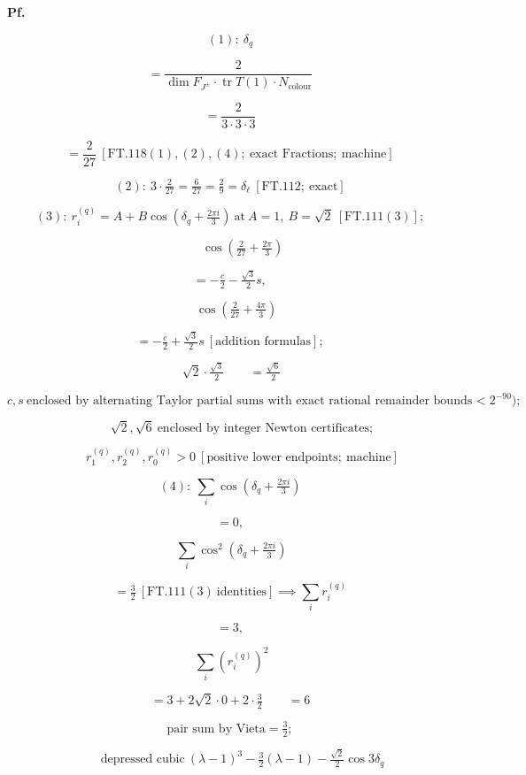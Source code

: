 \begin{theorem}[{\texorpdfstring{FT.119 — The triplet-attached mixing angle $\delta_q=2/27$ and its spectrum}{FT.119 - The triplet-attached mixing angle and its spectrum}}]
\textbf{Pf.}

\[
(1):\ \delta_q
\]

\[
= \frac{2}{\dim F_{J^\pm}\cdot\operatorname{tr}T(1)\cdot N_{\text{colour}}}
\]

\[
= \frac{2}{3\cdot3\cdot3}
\]

\[
= \frac2{27}\ [\mathrm{FT.118}(1),(2),(4);\ \text{exact Fractions};\ \text{machine}]
\]

\[
(2):\ 3\cdot\tfrac2{27}=\tfrac6{27}=\tfrac29=\delta_\ell\ [\mathrm{FT.112};\ \text{exact}]
\]

\[
(3):\ r^{(q)}_i=A+B\cos(\delta_q+\tfrac{2\pi i}3)\ \text{at}\ A=1,\ B=\sqrt2\ [\mathrm{FT.111}(3)];
\]

\[
\qquad \cos(\tfrac2{27}+\tfrac{2\pi}3)
\]

\[
= -\tfrac c2-\tfrac{\sqrt3}2s,
\]

\[
\quad\cos(\tfrac2{27}+\tfrac{4\pi}3)
\]

\[
= -\tfrac c2+\tfrac{\sqrt3}2s\ [\text{addition formulas}];
\]

\[
\ \sqrt2\cdot\tfrac{\sqrt3}2\qquad = \tfrac{\sqrt6}2
\]

\[
c,s\ \text{enclosed by alternating Taylor partial sums with exact rational remainder bounds (widths}<2^{-90}\text{)};
\]

\[
\qquad \sqrt2,\sqrt6\ \text{enclosed by integer Newton certificates};
\]

\[
\qquad r^{(q)}_1,r^{(q)}_2,r^{(q)}_0>0\ [\text{positive lower endpoints};\ \text{machine}]
\]

\[
(4):\ \sum_i\cos(\delta_q+\tfrac{2\pi i}3)
\]

\[
= 0,
\]

\[
\ \sum_i\cos^2(\delta_q+\tfrac{2\pi i}3)
\]

\[
= \tfrac32\ [\mathrm{FT.111}(3)\ \text{identities}]\implies\sum_ir^{(q)}_i
\]

\[
= 3,
\]

\[
\ \sum_i(r^{(q)}_i)^2
\]

\[
= 3+2\sqrt2\cdot0+2\cdot\tfrac32\qquad = 6
\]

\[
\text{pair sum by Vieta}=\tfrac32;
\]

\[
\qquad \text{depressed cubic}\ (\lambda-1)^3-\tfrac32(\lambda-1)-\tfrac{\sqrt2}2\cos3\delta_q
\]


\end{theorem}
